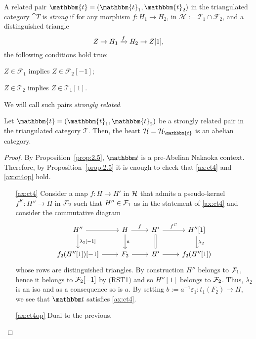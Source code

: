 \begin{definition}\label{def:strongly_related}
  A related pair $\mathbbm{t}=(\mathbbm{t}_1,\mathbbm{t}_2)$ in the triangulated category
  $\cat{T}$ is \emph{strong} if for any morphism $f:H_1\to H_2$, in $\mathcal{H}:=\mathcal{T}_1\cap\mathcal{F}_2$,
  and a distinguished triangle \[ Z\to H_1\xrightarrow{f}H_2\to Z[1],\] the following conditions
  hold true:
  \begin{relatedtorsion}
  \item\label{ax:rst1} $Z\in\mathcal{F}_1$ implies $Z\in\mathcal{F}_2[-1]$;
  \item\label{ax:rst2} $Z\in\mathcal{T}_2$ implies $Z\in\mathcal{T}_1[1]$.
  \end{relatedtorsion}

  We will call such pairs \emph{strongly related}.
\end{definition}

\begin{thm}\label{thm:2.6}
  Let $\mathbbm{t}=(\mathbbm{t}_1,\mathbbm{t}_2)$ be a strongly related pair in
  the triangulated category $\mathcal{T}$. Then, the heart $\mathcal{H}=\mathcal{H}_\mathbbm{t}$
  is an abelian category.
\end{thm}

\begin{proof}
  By Proposition~\ref{prop:2.5}, $\t$ is a pre-Abelian Nakaoka context. Therefore, by Proposition~\ref{prop:2.5} it is enough to check that \ref{ax:ct4} and \ref{ax:ct4op} hold.

  \begin{itemize}
    \item[\ref{ax:ct4}] Consider a map $f\colon H\to H'$ in $\mathcal{H}$ that admits a pseudo-kernel $f^K\colon H''\to H$ in $\mathcal{F}_2$ such that $H''\in\mathcal{F}_1$ as in the statement of \ref{ax:ct4} and consider the commutative diagram
      \begin{equation*}
        \begin{tikzcd}
          H''\arrow{r}\arrow{d}{\lambda_2[-1]}
          & H\arrow{r}{f}\arrow{d}{a}
          & H'\arrow{r}{f^C}\arrow[equal]{d}
          & H''[1]\arrow{d}{\lambda_2}\\
          f_2(H''[1])[-1]\arrow{r}
          & F_2\arrow{r}
          & H'\arrow{r}
          & f_2(H''[1])
        \end{tikzcd}
      \end{equation*}
      whose rows are distinguished triangles. By construction $H''$ belongs to $\mathcal{F}_1$, hence it belongs to $\mathcal{F}_2[-1]$ by (RST1) and so $H''[1]$ belongs to $\mathcal{F}_2$. Thus, $\lambda_2$ is an iso and as a consequence so is $a$. By setting $b:= a^{-1}\varepsilon_1\colon t_1(F_2)\to H$, we see that $\t$ satisfies \ref{ax:ct4}.
    \item[\ref{ax:ct4op}] Dual to the previous.
  \end{itemize}
\end{proof}

